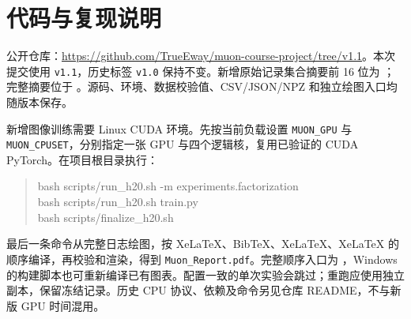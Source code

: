 \section{代码与复现说明}\label{sec:reproduce}
公开仓库：\url{https://github.com/TrueEway/muon-course-project/tree/v1.1}。本次提交使用 \texttt{v1.1}，历史标签 \texttt{v1.0} 保持不变。新增原始记录集合摘要前 16 位为 \texttt{\RevisionDigest}；完整摘要位于 。源码、环境、数据校验值、CSV/JSON/NPZ 和独立绘图入口均随版本保存。

新增图像训练需要 Linux CUDA 环境。先按当前负载设置 \texttt{MUON\_GPU} 与 \texttt{MUON\_CPUSET}，分别指定一张 GPU 与四个逻辑核，复用已验证的 CUDA PyTorch。在项目根目录执行：
\begin{quote}\small\ttfamily
bash scripts/run\_h20.sh -m experiments.factorization\\
bash scripts/run\_h20.sh train.py\\
bash scripts/finalize\_h20.sh
\end{quote}
最后一条命令从完整日志绘图，按 XeLaTeX、BibTeX、XeLaTeX、XeLaTeX 的顺序编译，再校验和渲染，得到 \texttt{Muon\_Report.pdf}。完整顺序入口为 ，Windows 的构建脚本也可重新编译已有图表。配置一致的单次实验会跳过；重跑应使用独立副本，保留冻结记录。历史 CPU 协议、依赖及命令另见仓库 README，不与新版 GPU 时间混用。
